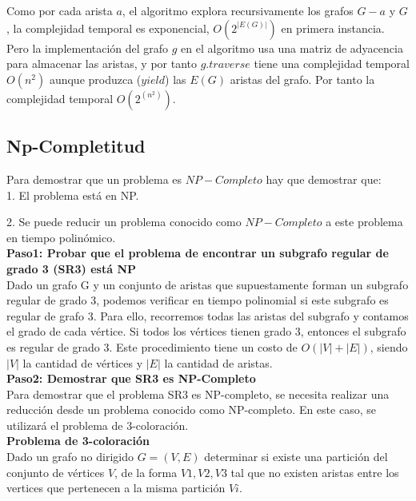 \documentclass[
10pt, %
a4paper, %
oneside, %
headinclude,footinclude, %
BCOR5mm, %
]{scrartcl}
\begin{document}
Como por cada arista $a$, el algoritmo explora recursivamente los grafos $G - a$ y $G$, la complejidad temporal es exponencial, $O (2^|E(G)|)$
en primera instancia. Pero la implementación del grafo $g$ en el algoritmo usa una matriz de adyacencia para almacenar las aristas, y por tanto $g.traverse$
tiene una complejidad temporal $O (n^2)$ aunque produzca ($yield$) las $E(G)$ aristas del grafo. Por tanto la complejidad temporal
$O (2^(n^2))$.


\subsection{Np-Completitud}

Para demostrar que un problema es $NP-Completo$ hay que demostrar que:\\

1. El problema está en NP.

2. Se puede reducir un problema conocido como $NP-Completo$ a este problema en tiempo polinómico.\\

\textbf{Paso1: Probar que el problema de encontrar un subgrafo regular de grado 3 (SR3) está NP }\\


Dado un grafo G y un conjunto de aristas que supuestamente forman un subgrafo regular de grado 3, podemos verificar en 
tiempo polinomial si este subgrafo es regular de grafo 3. Para ello, recorremos todas las aristas del subgrafo y contamos el grado de
cada vértice. Si todos los vértices tienen grado 3, entonces el subgrafo es regular de grado 3. Este procedimiento tiene un costo de 
$O(|V|+|E|)$, siendo $|V|$ la cantidad de vértices y $|E|$ la cantidad de aristas.\\


\textbf{Paso2: Demostrar que SR3 es NP-Completo}\\

Para demostrar que el problema SR3 es NP-completo, se necesita realizar una reducción desde un problema conocido como NP-completo. 
En este caso, se utilizará el problema de 3-coloración.\\


\textbf{ Problema de 3-coloración} \\


Dado un grafo no dirigido $G = (V,E)$ determinar si existe una partición del conjunto de vértices $V$,
de la forma ${V1,V2,V3}$ tal que no existen aristas entre los vertices que pertenecen a la misma partición $Vi$.\\
\end{document}
